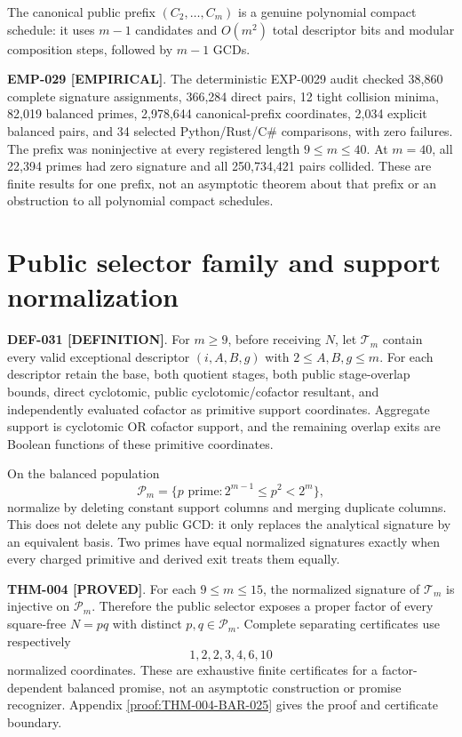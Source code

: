 \documentclass[11pt]{article}
\newcommand{\claimstatus}[2]{\textbf{#1 [#2]}}
\begin{document}
The canonical public prefix \((C_2,\ldots,C_m)\) is a genuine polynomial
compact schedule: it uses \(m-1\) candidates and
\(O(m^2)\) total descriptor bits and modular composition steps, followed by
\(m-1\) GCDs.

\claimstatus{EMP-029}{EMPIRICAL}. The deterministic EXP-0029 audit checked
38,860 complete signature assignments, 366,284 direct pairs, 12 tight
collision minima, 82,019 balanced
primes, 2,978,644 canonical-prefix coordinates, 2,034 explicit balanced
pairs, and 34 selected Python/Rust/C\# comparisons, with zero failures. The
prefix was noninjective at every registered length \(9\le m\le40\). At
\(m=40\), all 22,394 primes had zero signature and all 250,734,421 pairs
collided. These are finite results for one prefix, not an asymptotic theorem
about that prefix or an obstruction to all polynomial compact schedules.

\section{Public selector family and support normalization}

\claimstatus{DEF-031}{DEFINITION}. For \(m\ge9\), before receiving \(N\),
let \(\mathcal T_m\) contain every valid exceptional descriptor
\((i,A,B,g)\) with \(2\le A,B,g\le m\). For each descriptor retain the base,
both quotient stages, both public stage-overlap bounds, direct cyclotomic,
public cyclotomic/cofactor resultant, and independently evaluated cofactor as
primitive support coordinates. Aggregate support is cyclotomic OR cofactor
support, and the remaining overlap exits are Boolean functions of these
primitive coordinates.

On the balanced population
\[
\mathcal P_m=\{p\text{ prime}:2^{m-1}\le p^2<2^m\},
\]
normalize by deleting constant support columns and merging duplicate columns.
This does not delete any public GCD: it only replaces the analytical signature
by an equivalent basis. Two primes have equal normalized signatures exactly
when every charged primitive and derived exit treats them equally.

\claimstatus{THM-004}{PROVED}. For each \(9\le m\le15\), the normalized
signature of \(\mathcal T_m\) is injective on \(\mathcal P_m\). Therefore the
public selector exposes a proper factor of every square-free
\(N=pq\) with distinct \(p,q\in\mathcal P_m\). Complete separating
certificates use respectively
\[
1,2,2,3,4,6,10
\]
normalized coordinates. These are exhaustive finite certificates for a
factor-dependent balanced promise, not an asymptotic construction or promise
recognizer. Appendix \ref{proof:THM-004-BAR-025} gives the proof and
certificate boundary.
\end{document}
